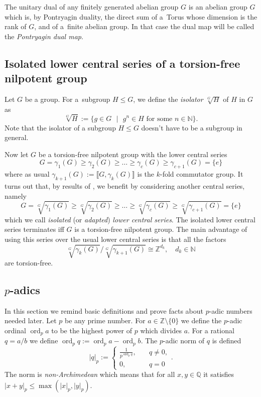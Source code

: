 \documentclass[12pt, a4paper]{amsart}
\def\Z{{\mathbb Z}}
\def\Q{{\mathbb Q}}
\def\ord{\operatorname{ord}}
\newcommand{\wh}[1]{\widehat{#1}}
\begin{document}
The unitary dual of any finitely generated abelian group $G$ is an abelian group $\wh G$ which is,
by Pontryagin duality, the direct sum
of a~Torus whose dimension is the rank of $G$, and of a~finite abelian group.
In that case the dual map will be called the \emph{Pontryagin dual map}.


\subsection{Isolated lower central series of a torsion-free nilpotent group}

Let $G$ be a group. For a~subgroup $H \leqslant G$, we define the \emph{isolator} $\sqrt[G]{H}$ of $H$ in $G$ as
$$
  \sqrt[G]{H} := \{g \in G \mbox{ } | \mbox{ } g^n \in H \mbox{ for some } n \in \mathbb{N} \}.
$$
Note that the isolator of a subgroup $H \leqslant G$ doesn't have to be a subgroup in general.

Now let $G$ be a torsion-free nilpotent group with the lower central series
$$
  G = \gamma_1(G) \geq \gamma_2(G) \geq \dots \geq \gamma_c(G) \geq \gamma_{c+1}(G) = \{e\}
$$
where as usual $\gamma_{k+1}(G) := \llbracket G, \gamma_k(G) \rrbracket$ is the $k$-fold commutator group.
It turns out that, by results of \cite[Lem.~1.1.2 and Lem.~1.1.4]{Dek}, we benefit by considering another central series, namely
\begin{equation}\label{equ:isolated-lcs}
  G = \sqrt[G]{\gamma_1(G)} \geq \sqrt[G]{\gamma_2(G)} \geq \dots \geq \sqrt[G]{\gamma_c(G)} \geq \sqrt[G]{\gamma_{c+1}(G)} = \{e\}
\end{equation}
which we call \emph{isolated} (or \emph{adapted}) \emph{lower central series}.
The isolated lower central series terminates iff $G$ is a torsion-free nilpotent group.
The main advantage of using this series over the usual lower central series is that all the factors
$$
  \sqrt[G]{\gamma_k(G)} / \sqrt[G]{\gamma_{k+1}(G)} \cong \mathbb{Z}^{d_k}, \quad d_k \in \mathbb{N}
$$
are torsion-free.


\subsection{$p$-adics}

In this section we remind basic definitions and prove facts about $p$-adic numbers needed later.
Let $p$ be any prime number. For $a \in \Z \setminus \{0\}$ we define the $p$-adic ordinal $\ord_p a$
to be the highest power of $p$ which divides $a$.
For a rational $q = a/b$ we define $\ord_p q := \ord_p a - \ord_p b$.
The $p$-adic norm of $q$ is defined
\[
  \left| q \right|_p := \begin{cases} \frac{1}{p^{\ord_p q}}, \quad &q \neq 0,\\ 0, \quad &q=0 \end{cases}.
\]
The norm is \emph{non-Archimedean} which means that for all $x, y \in \Q$
it satisfies $\left| x+y \right|_p \leq \max\left( |x|_p, |y|_p \right)$.
\end{document}
